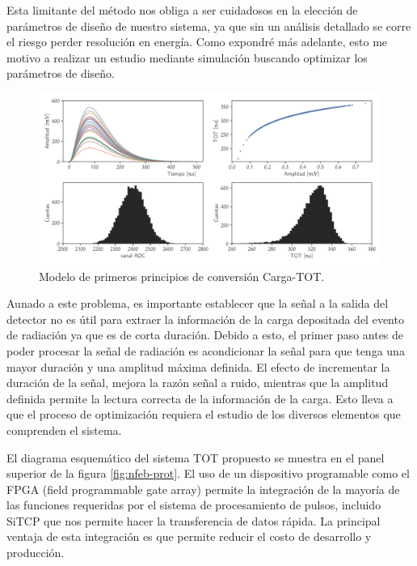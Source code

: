 Esta limitante del método nos obliga a ser cuidadosos en la elección de parámetros de diseño de nuestro sistema, ya que sin un análisis detallado se corre el riesgo perder resolución en energía. Como expondré más adelante, esto me motivo a realizar un estudio mediante simulación buscando optimizar los parámetros de diseño.

\begin{figure}
        \centering
        \includegraphics[width=\textwidth]{TOT-model.pdf}
        \caption{Modelo de primeros principios de conversión Carga-TOT.}
        \label{fig:tot-model}
\end{figure}

Aunado a este problema, es importante establecer que la señal a la salida del detector no es útil para extraer la información de la carga depositada del evento de radiación ya que es de corta duración. Debido a esto, el primer paso antes de poder procesar la señal de radiación es acondicionar la señal para que tenga una mayor duración y una amplitud máxima definida. El efecto de incrementar la duración de la señal, mejora la razón señal a ruido, mientras que la amplitud definida permite la lectura correcta de la información de la carga. Esto lleva a que el proceso de optimización requiera el estudio de los diversos elementos que comprenden el sistema.

El diagrama esquemático del sistema TOT propuesto se muestra en el panel superior de la figura \ref{fig:nfeb-prot}. El uso de un dispositivo programable como el FPGA (field programmable gate array) permite la integración de la mayoría de las funciones requeridas por el sistema de procesamiento de pulsos, incluido SiTCP que nos permite hacer la transferencia de datos rápida. La principal ventaja de esta integración es que permite reducir el costo de desarrollo y producción.

